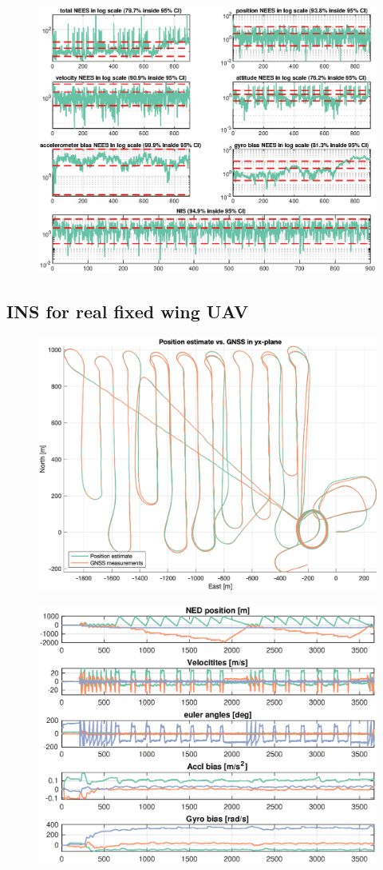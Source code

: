 \begin{figure}[!htb]
    \centering
    \includegraphics[width=0.8\linewidth]{figures/ga_2/sim_consistency.eps}
    \caption{}
    \label{fig:ga_2_sim_consistency}
\end{figure}

\subsection{INS for real fixed wing UAV}
\begin{figure}[!htb]
    \centering
    \includegraphics[width=0.6\linewidth]{figures/ga_2/real_trajectory.eps}
    \caption{}
    \label{fig:ga_2_real_trajectory}
\end{figure}

\begin{figure}[!htb]
    \centering
    \includegraphics[width=0.8\linewidth]{figures/ga_2/real_state.eps}
    \caption{}
    \label{fig:ga_2_real_state}
\end{figure}

